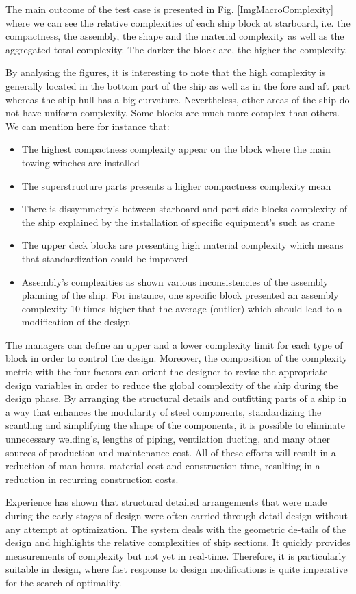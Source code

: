 The main outcome of the test case is presented in Fig. \ref{ImgMacroComplexity} where we can see the relative complexities of each ship block at starboard, i.e. the compactness, the assembly, the shape and the material complexity as well as the aggregated total complexity. The darker the block are, the higher the complexity.


By analysing the figures, it is interesting to note that the high complexity is generally located in the bottom part of the ship as well as in the fore and aft part whereas the ship hull has a big curvature. Nevertheless, other areas of the ship do not have uniform complexity. Some blocks are much more complex than others. We can mention here for instance that:
\begin{itemize}
\item The highest compactness complexity appear on the block where the main towing winches are installed
\item The superstructure parts presents a higher compactness complexity mean
\item There is dissymmetry's between starboard and port-side blocks complexity of the ship explained by the installation of specific equipment's such as crane
\item The upper deck blocks are presenting high material complexity which means that standardization could be improved
\item Assembly's complexities as shown various inconsistencies of the assembly planning of the ship. For instance, one specific block presented an assembly complexity 10 times higher that the average (outlier) which should lead to a modification of the design
\end{itemize}


The managers can define an upper and a lower complexity limit for each type of block in order to control the design. Moreover, the composition of the complexity metric with the four factors can orient the designer to revise the appropriate design variables in order to reduce the global complexity of the ship during the design phase. By arranging the structural details and outfitting parts of a ship in a way that enhances the modularity of steel components, standardizing the scantling and simplifying the shape of the components, it is possible to eliminate unnecessary welding's, lengths of piping, ventilation ducting, and many other sources of production and maintenance cost. All of these efforts will result in a reduction of man-hours, material cost and construction time, resulting in a reduction in recurring construction costs.


Experience has shown that structural detailed arrangements that were made during the early stages of design were often carried through detail design without any attempt at optimization. The system deals with the geometric de-tails of the design and highlights the relative complexities of ship sections. It quickly provides measurements of complexity but not yet in real-time. Therefore, it is particularly suitable in design, where fast response to design modifications is quite imperative for the search of optimality.
